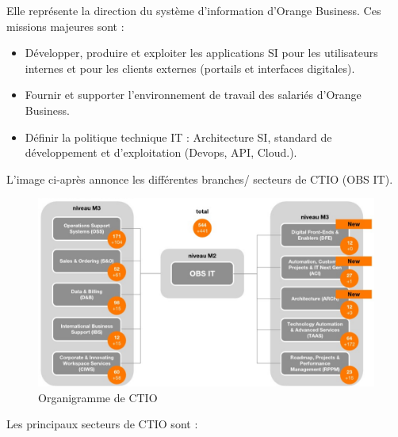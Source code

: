 Elle représente la direction du système d’information d’Orange Business. Ces missions majeures sont :
\begin{itemize}
    \item Développer, produire et exploiter les applications SI pour les utilisateurs internes et pour les clients externes (portails et interfaces digitales).
    \item Fournir et supporter l’environnement de travail des salariés d’Orange Business.
    \item Définir la politique technique IT : Architecture SI, standard de développement et d’exploitation (Devops, API, Cloud.).
\end{itemize}

\clearpage

L’image ci-après annonce les différentes branches/ secteurs de CTIO (OBS IT).

\begin{figure}[h]
    \centering
    \includegraphics[width=1\textwidth]{images/ctio_direction.png}
    \caption{Organigramme de CTIO}
    \label{fig:ctio_organigrame}
\end{figure}

Les principaux secteurs de CTIO sont :

